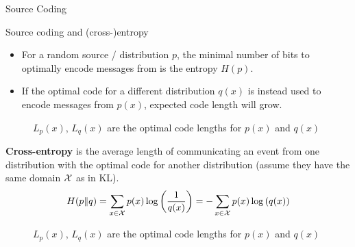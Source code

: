 \documentclass[11pt,compress,t,notes=noshow, xcolor=table]{beamer}
\begin{document}
\begin{vbframe} {Source Coding}
\end{vbframe}

\begin{vbframe} {Source coding and (cross-)entropy}

\begin{itemize}
  \item For a random source / distribution $p$, the minimal number of bits to optimally encode messages from is the entropy $H(p)$.
  \item If the optimal code for a different distribution $q(x)$ is instead used to encode messages from $p(x)$, expected code length will grow.
\end{itemize}
  \vspace{-0.3cm}
  \begin{figure}
    \centering
      \caption{\footnotesize{$L_p(x)$, $L_q(x)$ are the optimal code lengths for $p(x)$ and $q(x)$}}
  \end{figure}

\framebreak
\textbf{Cross-entropy} is the average length of communicating an event from one distribution with the optimal code for another distribution (assume they have the same domain $\mathcal{X}$ as in KL).
  $$ H(p \| q) = \sum_{x \in \mathcal{X}} p(x) \log\left(\frac{1}{q(x)}\right) = - \sum_{x \in \mathcal{X}} p(x) \log\left(q(x)\right) $$

\begin{figure}
    \centering
      \caption{\footnotesize{$L_p(x)$, $L_q(x)$ are the optimal code lengths for $p(x)$ and $q(x)$}}
  \end{figure}
  

\end{vbframe}
\end{document}
